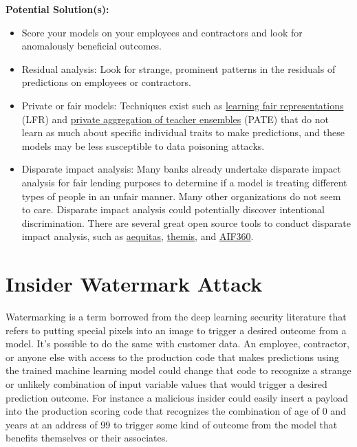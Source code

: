 \documentclass[fleqn]{article}
\begin{document}
\noindent\textbf{Potential Solution(s):} 
\begin{itemize}
\item Score your models on your employees and contractors and look for anomalously beneficial outcomes.
\item Residual analysis: Look for strange, prominent patterns in the residuals of predictions on employees or contractors.
\item Private or fair models: Techniques exist such as \href{https://www.cs.toronto.edu/~toni/Papers/icml-final.pdf}{learning fair representations} (LFR) and \href{https://arxiv.org/pdf/1802.08908.pdf}{private aggregation of teacher ensembles} (PATE) that do not learn as much about specific individual traits to make predictions, and these models may be less susceptible to data poisoning attacks. 
\item Disparate impact analysis: Many banks already undertake disparate impact analysis for fair lending purposes to determine if a model is treating different types of people in an unfair manner. Many other organizations do not seem to care. Disparate impact analysis could potentially discover intentional discrimination. There are several great open source tools to conduct disparate impact analysis, such as \href{https://github.com/dssg/aequitas}{aequitas}, \href{https://github.com/LASER-UMASS/Themis}{themis}, and \href{http://aif360.mybluemix.net/}{AIF360}.
\end{itemize}

\section{Insider Watermark Attack}

Watermarking is a term borrowed from the deep learning security literature that refers to putting special pixels into an image to trigger a desired outcome from a model. It's possible to do the same with customer data. An employee, contractor, or anyone else with access to the production code that makes predictions using the trained machine learning model could change that code to recognize a strange or unlikely combination of input variable values that would trigger a desired prediction outcome. For instance a malicious insider could easily insert a payload into the production scoring code that recognizes the combination of age of 0 and years at an address of 99 to trigger some kind of outcome from the model that benefits themselves or their associates.\\
\end{document}

